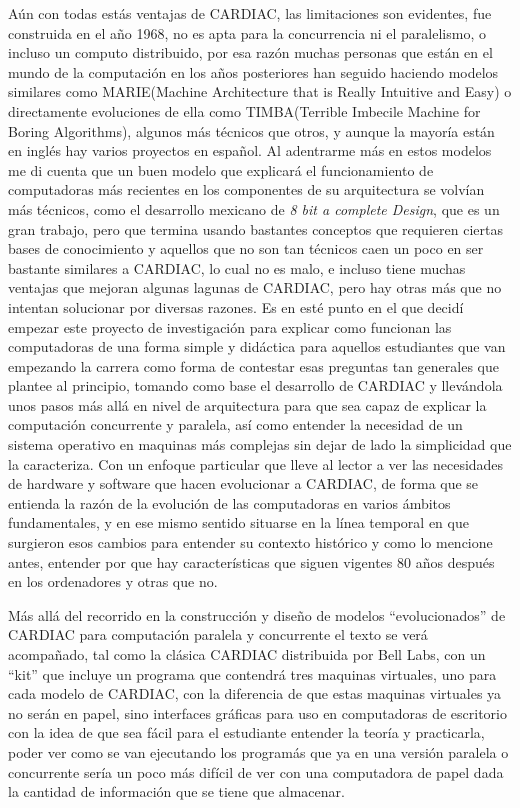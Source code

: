 \documentclass[letterpaper,12pt,oneside]{book}
\begin{document}
	Aún con todas estás ventajas de CARDIAC, las limitaciones son evidentes, fue construida en el año 1968, no es apta para la concurrencia ni el paralelismo, o 
	incluso un computo distribuido, por esa razón muchas personas que están en el mundo de la computación en los años posteriores han seguido haciendo
	modelos similares como MARIE(Machine Architecture that is Really Intuitive and Easy) o directamente evoluciones de ella como TIMBA(Terrible Imbecile Machine for Boring 
	Algorithms), algunos más técnicos que otros, y aunque la mayoría están en inglés hay varios proyectos en español. 
	Al adentrarme más en estos modelos me di cuenta que un buen modelo que explicará el funcionamiento de computadoras más recientes en los componentes de su arquitectura se volvían más técnicos, como el 
	desarrollo mexicano de \textit{8 bit a complete Design}, 
	que es un gran trabajo, pero que termina usando bastantes conceptos que requieren ciertas bases de conocimiento y aquellos que no son tan técnicos caen un poco en ser bastante similares a CARDIAC, lo cual no 
	es malo, e incluso tiene muchas ventajas que mejoran algunas lagunas de CARDIAC, pero hay otras más que no intentan solucionar por diversas razones. Es en esté punto en el que decidí empezar este
	proyecto de investigación para explicar como funcionan las computadoras de una forma simple y didáctica para aquellos estudiantes que van empezando la carrera
	como forma de contestar esas preguntas tan generales que plantee al principio,
	tomando como base el  desarrollo de CARDIAC y llevándola unos pasos más allá en nivel de arquitectura para que sea capaz de explicar
	la computación concurrente y paralela, así como entender la necesidad de un sistema operativo en maquinas más complejas sin dejar de lado la simplicidad que la 
	caracteriza.
	Con un enfoque particular que lleve al lector a ver las necesidades de hardware y software que hacen evolucionar a CARDIAC,
	de forma que se entienda la razón de la evolución de las computadoras en varios ámbitos fundamentales, y en ese mismo sentido situarse en la línea
	temporal en que surgieron esos cambios para entender su contexto histórico y como lo mencione antes, entender por que hay características  que siguen vigentes
	80 años después en los ordenadores y otras 	que no.
	
	
	Más allá del recorrido en la construcción y diseño de modelos ``evolucionados'' de CARDIAC para computación paralela y concurrente el texto se verá acompañado,
	tal como la clásica CARDIAC distribuida por Bell Labs, con un ``kit'' que incluye un programa que contendrá tres maquinas virtuales, uno para cada
	modelo de CARDIAC, con la diferencia de que estas maquinas virtuales ya no serán en papel, sino interfaces gráficas para uso en computadoras de escritorio con la idea de que sea fácil para el estudiante
	entender la teoría y practicarla, poder ver como se van ejecutando los programás que ya en una versión paralela o concurrente sería un poco más difícil de ver con una computadora de papel dada la cantidad de información que se tiene que almacenar.
	
\end{document}

